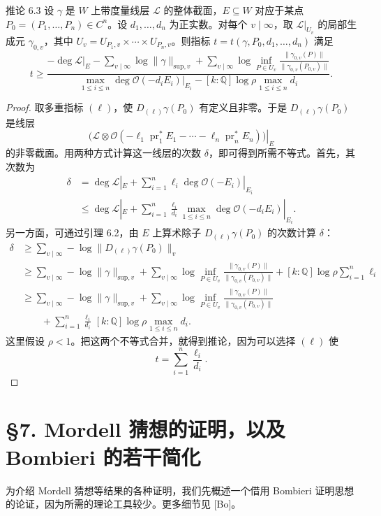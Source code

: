 \begin{statement}{推论 6.3}
设 $\gamma$ 是 $W$ 上带度量线层 $\mathscr L$ 的整体截面，$E\subseteq W$ 对应于某点 $P_0=(P_1,\ldots,P_n)\in C^n$。设 $d_1,\ldots,d_n$ 为正实数。对每个 $v\mid\infty$，取 $\mathscr L|_{U_v}$ 的局部生成元 $\gamma_{0,v}$，其中 $U_v=U_{P_1,v}\times\cdots\times U_{P_n,v}$。则指标 $t=t(\gamma,P_0,d_1,\ldots,d_n)$ 满足
\[
t\ge
\frac{\displaystyle
-\deg\mathscr L|_E-\sum_{v\mid\infty}\log\|\gamma\|_{\mathrm{sup},v}
+\sum_{v\mid\infty}\log\inf_{P\in U_v}\frac{\|\gamma_{0,v}(P)\|}{\|\gamma_{0,v}(P_{0,v})\|}}
{\displaystyle
\max_{1\le i\le n}\deg\mathcal O(-d_iE_i)|_{E_i}
-[k:\mathbb Q]\log\rho\max_{1\le i\le n}d_i}.
\]
\end{statement}
\begin{proof}
取多重指标 $(\ell)$，使 $D_{(\ell)}\gamma(P_0)$ 有定义且非零。于是 $D_{(\ell)}\gamma(P_0)$ 是线层
\[
\left.\bigl(\mathscr L\otimes\mathcal O(-\ell_1\operatorname{pr}_1^*E_1-\cdots-\ell_n\operatorname{pr}_n^*E_n)\bigr)\right|_E
\]
的非零截面。用两种方式计算这一线层的次数 $\delta$，即可得到所需不等式。首先，其次数为
\begin{align*}
\delta&=\deg\mathscr L|_E+\sum_{i=1}^n\ell_i\deg\mathcal O(-E_i)|_{E_i}\\
&\le\deg\mathscr L|_E+\sum_{i=1}^n\frac{\ell_i}{d_i}
\max_{1\le i\le n}\deg\mathcal O(-d_iE_i)|_{E_i}.
\end{align*}
另一方面，可通过引理 6.2，由 $E$ 上算术除子 $D_{(\ell)}\gamma(P_0)$ 的次数计算 $\delta$：
\begin{align*}
\delta&\ge\sum_{v\mid\infty}-\log\|D_{(\ell)}\gamma(P_0)\|_v\\
&\ge\sum_{v\mid\infty}-\log\|\gamma\|_{\mathrm{sup},v}
+\sum_{v\mid\infty}\log\inf_{P\in U_v}\frac{\|\gamma_{0,v}(P)\|}{\|\gamma_{0,v}(P_{0,v})\|}
+[k:\mathbb Q]\log\rho\sum_{i=1}^n\ell_i\\
&\ge\sum_{v\mid\infty}-\log\|\gamma\|_{\mathrm{sup},v}
+\sum_{v\mid\infty}\log\inf_{P\in U_v}\frac{\|\gamma_{0,v}(P)\|}{\|\gamma_{0,v}(P_{0,v})\|}\\
&\qquad+\sum_{i=1}^n\frac{\ell_i}{d_i}\,[k:\mathbb Q]\log\rho\max_{1\le i\le n}d_i.
\end{align*}
这里假设 $\rho<1$。把这两个不等式合并，就得到推论，因为可以选择 $(\ell)$ 使
\[
t=\sum_{i=1}^n\frac{\ell_i}{d_i}.
\]
\end{proof}

\section*{§7. Mordell 猜想的证明，以及 Bombieri 的若干简化}
为介绍 Mordell 猜想等结果的各种证明，我们先概述一个借用 Bombieri 证明思想的论证，因为所需的理论工具较少。更多细节见 [Bo]。

